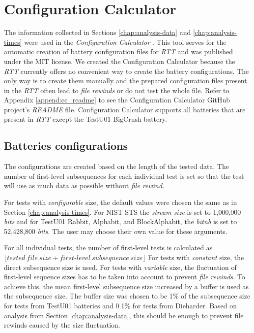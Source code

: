 \documentclass[
  digital,     %
  oneside,     %
  nosansbold,  %
  nocolorbold, %
  nolof,         %
  nolot,         %
]{fithesis4}
\begin{document}

\section{Configuration Calculator} \label{chap:analysis-config-calc}

The information collected in Sections \ref{chap:analysis-data} and \ref{chap:analysis-times} were used in the \emph{Configuration Calculator} \cite{config_calc}. This tool serves for the automatic creation of battery configuration files for \emph{RTT} and was published under the MIT license. We created the Configuration Calculator because the \emph{RTT} currently offers no convenient way to create the battery configurations. The only way is to create them manually and the prepared configuration files present in the \emph{RTT} often lead to \emph{file rewinds} or do not test the whole file. Refer to Appendix \ref{append:cc_readme} to see the Configuration Calculator GitHub project's \emph{README} file. Configuration Calculator supports all batteries that are present in \emph{RTT} except the TestU01 BigCrush battery.

\subsection{Batteries configurations}

The configurations are created based on the length of the tested data. The number of first-level subsequences for each individual test is set so that the test will use as much data as possible without \emph{file rewind}.

For tests with \emph{configurable} size, the default values were chosen the same as in Section \ref{chap:analysis-times}. For NIST STS the \emph{stream size} is set to 1,000,000 \emph{bits} and for TestU01 Rabbit, Alphabit, and BlockAlphabit, the \emph{bit\textunderscore nb} is set to  52,428,800 \emph{bits}. The user may choose their own value for these arguments.

For all individual tests, the number of first-level tests is calculated as 
$\lfloor tested\:file\:size \div first\mbox{-}level\:subsequence\:size\rfloor$
For tests with \emph{constant} size, the direct subsequence size is used. For tests with \emph{variable} size, the fluctuation of first-level sequence sizes has to be taken into account to prevent \emph{file rewinds}. To achieve this, the mean first-level subsequence size increased by a buffer is used as the subsequence size. The buffer size was chosen to be 1\% of the subsequence size for tests from TestU01 batteries and 0.1\% for tests from Dieharder. Based on analysis from Section \ref{chap:analysis-data}, this should be enough to prevent file rewinds caused by the size fluctuation.
\end{document}
